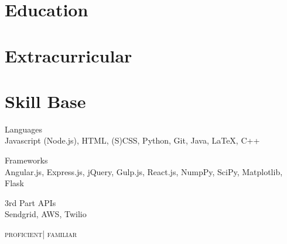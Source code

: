 \documentclass[9pt]{article}
\begin{document}
        \begin{minipage}[t]{0.35\textwidth}
            \vspace{0pt}

            \section{Education}

                

                

            \section{Extracurricular}

                

                

                

            \section{Skill Base}
            {\raggedright
                Languages \\
                {\small
                    {\color{highlight}
                        Javascript (Node.js), HTML, (S)CSS, Python, Git,
                    }
                    Java, LaTeX, C++
                }
                \vspace{5pt}

                Frameworks \\
                {\small
                    {\color{highlight}
                        Angular.js, Express.js, jQuery, Gulp.js,
                    }
                    React.js, NumpPy, SciPy, Matplotlib, Flask \\
                }

                \vspace{5pt}

                3rd Part APIs \\
                {\small
                    {\color{highlight}
                        Sendgrid, AWS,
                    }
                    Twilio
                }

                \hfill\textsc{\footnotesize{{\color{highlight} proficient}| familiar}}
            }
        \end{minipage}
\end{document}
